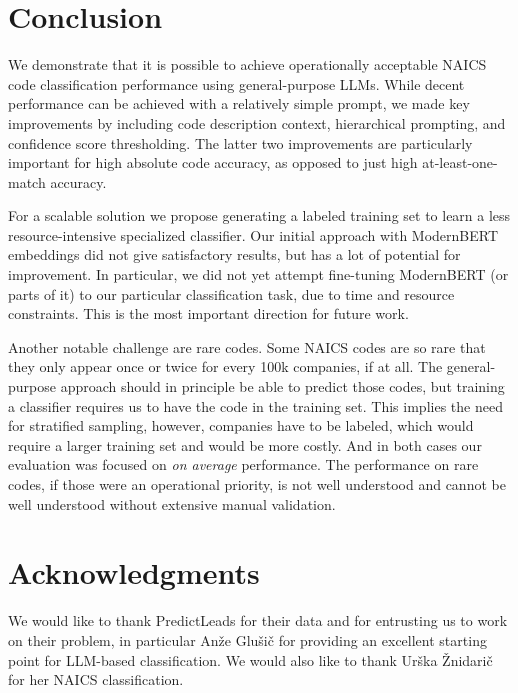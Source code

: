 \documentclass[fleqn,moreauthors,10pt]{ds_report}
\begin{document}

\section*{Conclusion}

We demonstrate that it is possible to achieve operationally acceptable NAICS code classification performance using general-purpose LLMs. While decent performance can be achieved with a relatively simple prompt, we made key improvements by including code description context, hierarchical prompting, and confidence score thresholding. The latter two improvements are particularly important for high absolute code accuracy, as opposed to just high at-least-one-match accuracy.

For a scalable solution we propose generating a labeled training set to learn a less resource-intensive specialized classifier. Our initial approach with ModernBERT embeddings did not give satisfactory results, but has a lot of potential for improvement. In particular, we did not yet attempt fine-tuning ModernBERT (or parts of it) to our particular classification task, due to time and resource constraints. This is the most important direction for future work.

Another notable challenge are rare codes. Some NAICS codes are so rare that they only appear once or twice for every 100k companies, if at all. The general-purpose approach should in principle be able to predict those codes, but training a classifier requires us to have the code in the training set. This implies the need for stratified sampling, however, companies have to be labeled, which would require a larger training set and would be more costly. And in both cases our evaluation was focused on \emph{on average} performance. The performance on rare codes, if those were an operational priority, is not well understood and cannot be well understood without extensive manual validation.


\section*{Acknowledgments}

We would like to thank PredictLeads for their data and for entrusting us to work on their problem, in particular Anže Glušič for providing an excellent starting point for LLM-based classification. We would also like to thank Urška Žnidarič for her NAICS classification.



\end{document}
